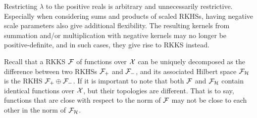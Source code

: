 Restricting $\lambda$ to the positive reals is arbitrary and unnecessarily restrictive.
Especially when considering sums and products of scaled RKHSs, having negative scale parameters also give additional flexibility.
The resulting kernels from summation and/or multiplication with negative kernels may no longer be positive-definite, and in such cases, they give rise to RKKS instead.

\begin{remark}
  Recall that a RKKS ${\mathcal F}$ of functions over ${\mathcal X}$ can be uniquely decomposed as the difference between two RKHSs ${\mathcal F}_+$ and ${\mathcal F}_-$, and its associated Hilbert space ${\mathcal F}_{\mathcal H}$ is the RKHS ${\mathcal F}_+ \oplus {\mathcal F}_-$.
  If it is important to note that both ${\mathcal F}$ and ${\mathcal F}_{\mathcal H}$  contain identical functions over ${\mathcal X}$, but their topologies are different.
  That is to say, functions that are close with respect to the norm of ${\mathcal F}$ may not be close to each other in the norm of ${\mathcal F}_{\mathcal H}$.
\end{remark}


